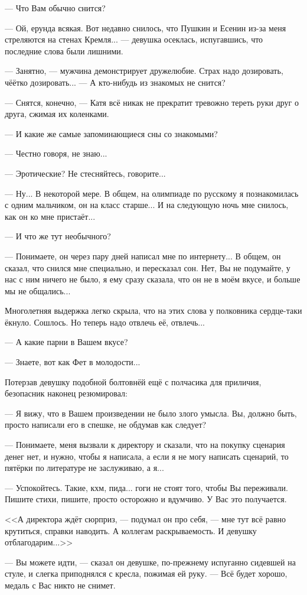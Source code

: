 --- Что Вам обычно снится?

--- Ой, ерунда всякая. Вот недавно снилось, что Пушкин и Есенин из-за меня стреляются на стенах Кремля...
--- девушка осеклась, испугавшись, что последние слова были лишними.

--- Занятно, --- мужчина демонстрирует дружелюбие. Страх надо дозировать, чёётко дозировать...
--- А кто-нибудь из знакомых не снится?

--- Снятся, конечно, --- Катя всё никак не прекратит тревожно тереть руки друг о друга, сжимая их коленками.

--- И какие же самые запоминающиеся сны со знакомыми?

--- Честно говоря, не знаю...

--- Эротические? Не стесняйтесь, говорите...

--- Ну... В некоторой мере. В общем, на олимпиаде по русскому я познакомилась с одним мальчиком, он на класс старше...
И на следующую ночь мне снилось, как он ко мне пристаёт...

--- И что же тут необычного?

--- Понимаете, он через пару дней написал мне по интернету... В общем, он сказал, что снился мне специально, и пересказал сон.
Нет, Вы не подумайте, у нас с ним ничего не было, я ему сразу сказала, что он не в моём вкусе, и больше мы не общались...

Многолетняя выдержка легко скрыла, что на этих слова у полковника сердце-таки ёкнуло. Сошлось.
Но теперь надо отвлечь её, отвлечь...

--- А какие парни в Вашем вкусе?

--- Знаете, вот как Фет в молодости...

Потерзав девушку подобной болтовнёй ещё с полчасика для приличия, безопасник наконец резюмировал:

--- Я вижу, что в Вашем произведении не было злого умысла. Вы, должно быть, просто написали его в спешке, не обдумав как следует?

--- Понимаете, меня вызвали к директору и сказали, что на покупку сценария денег нет,
и нужно, чтобы я написала, а если я не могу написать сценарий, то пятёрки по литературе не заслуживаю, а я...

--- Успокойтесь. Такие, кхм, пида... гоги не стоят того, чтобы Вы переживали.
Пишите стихи, пишите, просто осторожно и вдумчиво. У Вас это получается.

<<А директора ждёт сюрприз, --- подумал он про себя,
--- мне тут всё равно крутиться, справки наводить. А коллегам раскрываемость. И девушку отблагодарим...>>

--- Вы можете идти, --- сказал он девушке, по-прежнему испуганно сидевшей на стуле,
и слегка приподнялся с кресла, пожимая ей руку. --- Всё будет хорошо, медаль с Вас никто не снимет.

\emptypar

\emptypar


